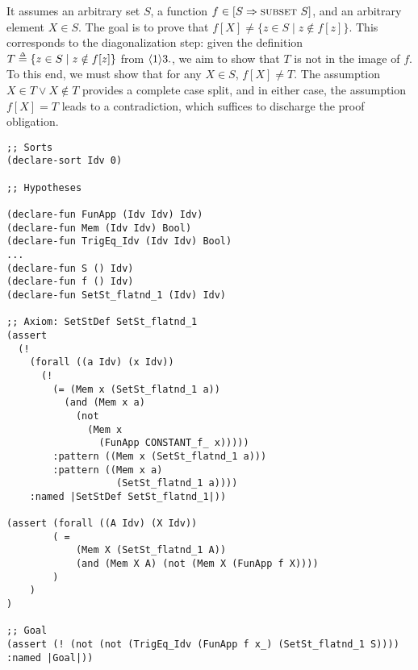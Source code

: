 It assumes an arbitrary set $S$, a function $f \in [S \implies \SUBSET\ S]$, and an arbitrary element $X \in S$.
The goal is to prove that $f[X] \neq \{ z \in S \mid z \notin f[z] \}$.
This corresponds to the diagonalization step: given the definition $T \mathrel{\smash{\stackrel{\scriptscriptstyle\Delta}{=}}} \{ z \in S \mid z \notin f[z] \}$ from $\langle 1 \rangle 3.$, we aim to show that $T$ is not in the image of $f$.
To this end, we must show that for any $X \in S$, $f[X] \neq T$.
The assumption $X \in T \lor X \notin T$ provides a complete case split, and in either case, the assumption $f[X] = T$ leads to a contradiction, which suffices to discharge the proof obligation.


\smallskip

\begin{lstlisting}[language=SMT, caption={Proof obligation of step $\ps{1}{6.}$ in Cantor theorem},label={lst:cantor-smt}]
;; Sorts
(declare-sort Idv 0)

;; Hypotheses

(declare-fun FunApp (Idv Idv) Idv)
(declare-fun Mem (Idv Idv) Bool)
(declare-fun TrigEq_Idv (Idv Idv) Bool)
...
(declare-fun S () Idv)
(declare-fun f () Idv)
(declare-fun SetSt_flatnd_1 (Idv) Idv)

;; Axiom: SetStDef SetSt_flatnd_1
(assert
  (!
    (forall ((a Idv) (x Idv))
      (!
        (= (Mem x (SetSt_flatnd_1 a))
          (and (Mem x a)
            (not
              (Mem x
                (FunApp CONSTANT_f_ x)))))
        :pattern ((Mem x (SetSt_flatnd_1 a)))
        :pattern ((Mem x a)
                   (SetSt_flatnd_1 a))))
    :named |SetStDef SetSt_flatnd_1|))

(assert (forall ((A Idv) (X Idv))
        ( = 
            (Mem X (SetSt_flatnd_1 A))
            (and (Mem X A) (not (Mem X (FunApp f X))))
        )
    )
)

;; Goal
(assert (! (not (not (TrigEq_Idv (FunApp f x_) (SetSt_flatnd_1 S)))) :named |Goal|))
\end{lstlisting}

\smallskip

